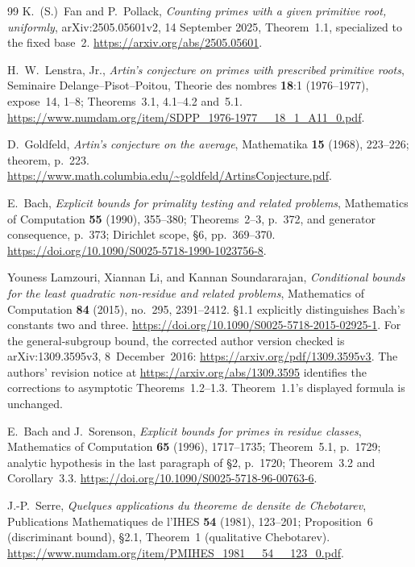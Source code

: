 \begin{thebibliography}{99}
K.~(S.)~Fan and P.~Pollack, \emph{Counting primes with a given
primitive root, uniformly}, arXiv:2505.05601v2, 14 September 2025,
Theorem~1.1, specialized to the fixed base~2.
\url{https://arxiv.org/abs/2505.05601}.

H.~W.~Lenstra, Jr., \emph{Artin's conjecture on primes with
prescribed primitive roots}, Seminaire Delange--Pisot--Poitou,
Theorie des nombres \textbf{18}:1 (1976--1977), expose~14, 1--8;
Theorems~3.1, 4.1--4.2 and~5.1.
\url{https://www.numdam.org/item/SDPP_1976-1977__18_1_A11_0.pdf}.

D.~Goldfeld, \emph{Artin's conjecture on the average},
Mathematika \textbf{15} (1968), 223--226; theorem, p.~223.
\url{https://www.math.columbia.edu/~goldfeld/ArtinsConjecture.pdf}.

E.~Bach, \emph{Explicit bounds for primality testing and related
problems}, Mathematics of Computation \textbf{55} (1990),
355--380; Theorems~2--3, p.~372, and generator consequence, p.~373;
Dirichlet scope, \S6, pp.~369--370.
\url{https://doi.org/10.1090/S0025-5718-1990-1023756-8}.

Youness Lamzouri, Xiannan Li, and Kannan Soundararajan,
\emph{Conditional bounds for the least quadratic non-residue and related problems},
Mathematics of Computation \textbf{84} (2015), no.~295, 2391--2412.
\S1.1 explicitly distinguishes Bach's constants two and three.
\url{https://doi.org/10.1090/S0025-5718-2015-02925-1}.
For the general-subgroup bound, the corrected author version checked
is arXiv:1309.3595v3, 8~December~2016:
\url{https://arxiv.org/pdf/1309.3595v3}.
The authors' revision notice at
\url{https://arxiv.org/abs/1309.3595} identifies the corrections to
asymptotic Theorems~1.2--1.3. Theorem~1.1's displayed formula is unchanged.

E.~Bach and J.~Sorenson, \emph{Explicit bounds for primes in
residue classes}, Mathematics of Computation \textbf{65} (1996),
1717--1735; Theorem~5.1, p.~1729; analytic hypothesis in the
last paragraph of \S2, p.~1720; Theorem~3.2 and Corollary~3.3.
\url{https://doi.org/10.1090/S0025-5718-96-00763-6}.

J.-P.~Serre, \emph{Quelques applications du theoreme de densite
de Chebotarev}, Publications Mathematiques de l'IHES
\textbf{54} (1981), 123--201; Proposition~6 (discriminant bound),
\S2.1, Theorem~1 (qualitative Chebotarev).
\url{https://www.numdam.org/item/PMIHES_1981__54__123_0.pdf}.


\end{thebibliography}
